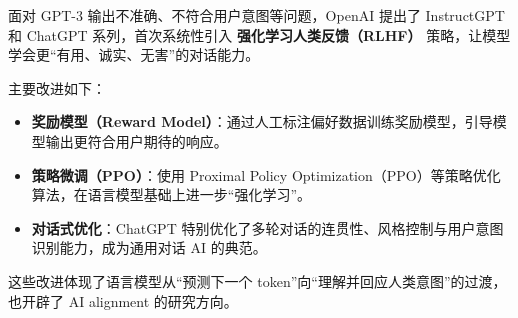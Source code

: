 \documentclass[a4paper,12pt]{article}
\begin{document}
面对 GPT-3 输出不准确、不符合用户意图等问题，OpenAI 提出了 InstructGPT 和 ChatGPT 系列，首次系统性引入 \textbf{强化学习人类反馈（RLHF）} 策略，让模型学会更“有用、诚实、无害”的对话能力。

主要改进如下：

\begin{itemize}
    \item \textbf{奖励模型（Reward Model）}：通过人工标注偏好数据训练奖励模型，引导模型输出更符合用户期待的响应。
    \item \textbf{策略微调（PPO）}：使用 Proximal Policy Optimization（PPO）等策略优化算法，在语言模型基础上进一步“强化学习”。
    \item \textbf{对话式优化}：ChatGPT 特别优化了多轮对话的连贯性、风格控制与用户意图识别能力，成为通用对话 AI 的典范。
\end{itemize}

这些改进体现了语言模型从“预测下一个 token”向“理解并回应人类意图”的过渡，也开辟了 AI alignment 的研究方向。
\end{document}

